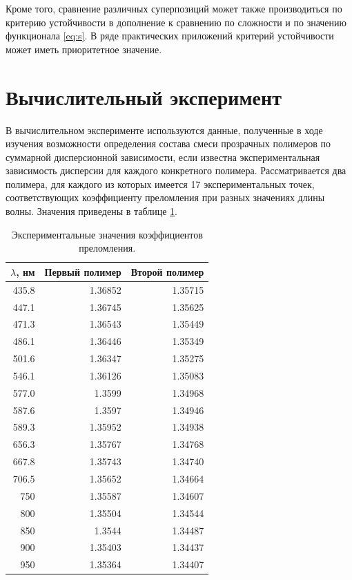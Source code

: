 \documentclass[11pt,a4paper]{article}
\theoremstyle{definition}
\begin{document}
Кроме того, сравнение различных суперпозиций может также производиться по
критерию устойчивости в дополнение к сравнению по сложности и по значению
функционала \eqref{eq:s}. В ряде практических приложений критерий устойчивости
может иметь приоритетное значение.

\section{Вычислительный эксперимент}

В вычислительном эксперименте используются данные, полученные в ходе
изучения возможности определения состава смеси прозрачных
полимеров по суммарной дисперсионной зависимости, если известна экспериментальная
зависимость дисперсии для каждого конкретного полимера. Рассматривается два
полимера, для каждого из которых имеется 17 экспериментальных точек,
соответствующих коэффициенту преломления при разных значениях длины волны.
Значения приведены в таблице \ref{tabl:source_data}.

\begin{table}[h]
  \footnotesize
  \begin{tabular}{| r | r | r |} \hline
	$\lambda$, нм	& Первый полимер & Второй полимер \\ \hline
	435.8 & 1.36852 & 1.35715 \\ \hline
	447.1 & 1.36745 & 1.35625 \\ \hline
	471.3 & 1.36543 & 1.35449 \\ \hline
	486.1 & 1.36446 & 1.35349 \\ \hline
	501.6 & 1.36347 & 1.35275 \\ \hline
	546.1 & 1.36126 & 1.35083 \\ \hline
	577.0 & 1.3599 & 1.34968 \\ \hline
	587.6 & 1.3597 & 1.34946 \\ \hline
	589.3 & 1.35952 & 1.34938 \\ \hline
	656.3 & 1.35767 & 1.34768 \\ \hline
	667.8 & 1.35743 & 1.34740 \\ \hline
	706.5 & 1.35652 & 1.34664 \\ \hline
	750 & 1.35587 & 1.34607 \\ \hline
	800 & 1.35504 & 1.34544 \\ \hline
	850 & 1.3544 & 1.34487 \\ \hline
	900 & 1.35403 & 1.34437 \\ \hline
	950 & 1.35364 & 1.34407 \\ \hline
  \end{tabular}
  \caption{Экспериментальные значения коэффициентов преломления.}
  \label{tabl:source_data}
\end{table}
\end{document}
